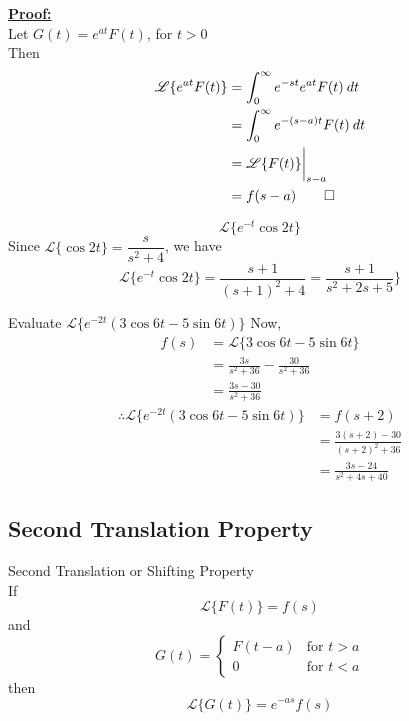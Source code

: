 \documentclass[12pt]{article}
\newcommand{\Lap}{\mathscr{L}}
\begin{document}
\underline{\textbf{Proof: }} \\
Let $G(t) = e^{at}F(t)$, for $t>0$\\
Then\\
\begin{align*}
    \Lap \{ e^{at}F(t) \} &= \int_{0}^{\infty} {e^{-st}e^{at}F(t)} \: d{t} \\
    &= \int_{0}^{\infty} {e^{-(s-a)t}F(t)} \: d{t} \\
    &= \Lap \{ F(t) \} \bigg|_{s-a} \\
    &= f(s-a)\qed
\end{align*}

\begin{example}{\[
    \Lap \{ e^{-t}\cos{2t} \}
\]}{}
    Since $\Lap \{ \cos{2t} \} = \dfrac{s}{s^2+4}$, we have
    \[
    \Lap \{ e^{-t}\cos{2t} \} = \frac{s+1}{(s+1)^2 + 4} = \frac{s+1}{s^2+2s+5} \}
    \]
\end{example}

\begin{example}{Evaluate $\Lap \{ e^{-2t} (3\cos{6t} - 5\sin{6t}) \}$}{}
    Now,
    \begin{align*}
        f(s) &= \Lap \{ 3\cos{6t} - 5\sin{6t} \} \\
        &= \frac{3s}{s^2+36} - \frac{30}{s^2+36} \\
        &= \frac{3s-30}{s^2+36}
    \end{align*}
    \begin{align*}
        \therefore \Lap \{ e^{-2t} (3\cos{6t} - 5\sin{6t}) \} &= f(s+2) \\
        &= \frac{3(s+2)-30}{(s+2)^2+36} \\
        &= \frac{3s-24}{s^2 + 4s + 40}
    \end{align*}
\end{example}

\subsection{Second Translation Property}
\begin{theorem}{Second Translation or Shifting Property}{}
    \\If \[
        \Lap \{ F(t) \} = f(s)
    \] and \[
        G(t) = 
        \begin{cases}
            F(t-a) & \text{for } t>a \\
            0 & \text{for } t < a
        \end{cases}
    \] then
    \[
        \Lap \{ G(t) \} = e^{-as}f(s)
    \]

\end{theorem}
\end{document}
